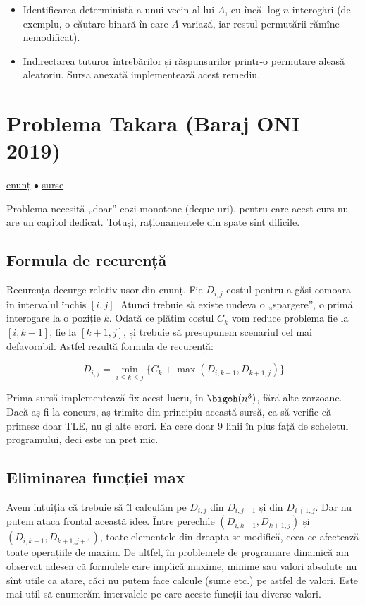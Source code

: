 \begin{itemize}
  \item Identificarea deterministă a unui vecin al lui $A$, cu încă $\log n$ interogări (de exemplu, o căutare binară în care $A$ variază, iar restul permutării rămîne nemodificat).
  \item Indirectarea tuturor întrebărilor și răspunsurilor printr-o permutare aleasă aleatoriu. Sursa anexată implementează acest remediu.
\end{itemize}


\section{Problema Takara (Baraj ONI 2019)}
\label{problem:takara}

\href{https://kilonova.ro/problems/411}{enunț}
$\bullet$
\hyperref[code:takara]{surse}

Problema necesită „doar” cozi monotone (deque-uri), pentru care acest curs nu are un capitol dedicat. Totuși, raționamentele din spate sînt dificile.

\subsection{Formula de recurență}

Recurența decurge relativ ușor din enunț. Fie $D_{i,j}$ costul pentru a găsi comoara în intervalul închis $[i,j]$. Atunci trebuie să existe undeva o „spargere”, o primă interogare la o poziție $k$. Odată ce plătim costul $C_k$ vom reduce problema fie la $[i, k - 1]$, fie la $[k + 1, j]$, și trebuie să presupunem scenariul cel mai defavorabil. Astfel rezultă formula de recurență:

$$D_{i,j} = \min_{i \leq k \leq j} \{ C_k + \max(D_{i,k-1}, D_{k+1,j}) \}$$

Prima sursă implementează fix acest lucru, în $\bigoh(n^3)$, fără alte zorzoane. Dacă aș fi la concurs, aș trimite din principiu această sursă, ca să verific că primesc doar TLE, nu și alte erori. Ea cere doar 9 linii în plus față de scheletul programului, deci este un preț mic.

\subsection{Eliminarea funcției max}

Avem intuiția că trebuie să îl calculăm pe $D_{i,j}$ din $D_{i,j-1}$ și din $D_{i+1,j}$. Dar nu putem ataca frontal această idee. Între perechile $(D_{i,k-1}, D_{k+1,j})$ și $(D_{i,k-1}, D_{k+1,j+1})$, toate elementele din dreapta se modifică, ceea ce afectează toate operațiile de maxim. De altfel, în problemele de programare dinamică am observat adesea că formulele care implică maxime, minime sau valori absolute nu sînt utile ca atare, căci nu putem face calcule (sume etc.) pe astfel de valori. Este mai util să enumerăm intervalele pe care aceste funcții iau diverse valori.

